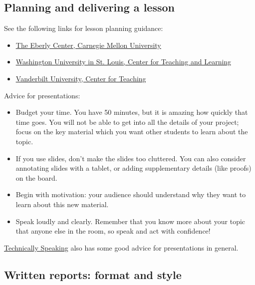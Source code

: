 \documentclass[11pt]{article}
\begin{document}
\subsection*{Planning and delivering a lesson}

See the following links for lesson planning guidance:

\begin{itemize}
\item \href{https://www.cmu.edu/teaching/designteach/teach/instructionalstrategies/lectures.html}{\underline{The Eberly Center, Carnegie Mellon University}}

\item \href{https://ctl.wustl.edu/resource-category/instructional-strategies/}{\underline{Washington University in St. Louis, Center for Teaching and Learning}}

\item \href{https://cft.vanderbilt.edu/teaching-guides/pedagogies-and-strategies/}{\underline{Vanderbilt University, Center for Teaching}}
\end{itemize}

\noindent Advice for presentations:

\begin{itemize}
\item Budget your time. You have 50 minutes, but it is amazing how quickly that time goes. You will not be able to get into all the details of your project; focus on the key material which you want other students to learn about the topic.

\item If you use slides, don't make the slides too cluttered. You can also consider annotating slides with a tablet, or adding supplementary details (like proofs) on the board.

\item Begin with motivation: your audience should understand why they want to learn about this new material.

\item Speak loudly and clearly. Remember that you know more about your topic that anyone else in the room, so speak and act with confidence!
\end{itemize}

\noindent \href{http://techspeaking.denison.edu/Technically_Speaking/Home.html}{\underline{Technically Speaking}} also has some good advice for presentations in general.

\subsection*{Written reports: format and style}
\end{document}
